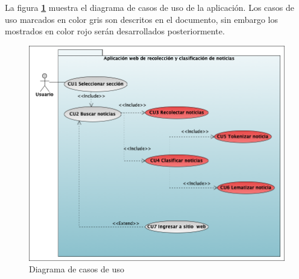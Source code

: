 


La figura \textbf{\ref{fig:DCU}} muestra el diagrama de casos de uso de la aplicación. Los casos de uso marcados en color gris son descritos en el documento, sin embargo los mostrados en color rojo serán desarrollados posteriormente.

\begin{figure}[h]
  \centering
  \includegraphics[scale=.4]{imagenes/Diagramas/CasosDeuso/CasosDeUso}
  \caption{Diagrama de casos de uso}
  \label{fig:DCU}
\end{figure}
